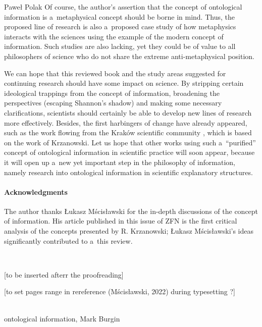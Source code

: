 \begin{newrevengenv}{Paweł Polak}
Of course, the author's assertion that the concept of ontological information is a~metaphysical concept should be borne in mind. Thus, the proposed line of research is also a~proposed case study of how metaphysics interacts with the sciences using the example of the modern concept of information. Such studies are also lacking, yet they could be of value to all philosophers of science who do not share the extreme anti-metaphysical position.

We can hope that this reviewed book and the study areas suggested for continuing research should have some impact on science. By stripping certain ideological trappings from the concept of information, broadening the perspectives (escaping Shannon's shadow) and making some necessary clarifications, scientists should certainly be able to develop new lines of research more effectively. Besides, the first harbingers of change have already appeared, such as the work flowing from the Kraków scientific community
\parencite[][]{bielecki_information_2022}, %
 which is based on the work of Krzanowski. Let us hope that other works using such a~``purified'' concept of ontological information in scientific practice will soon appear, because it will open up a~new yet important step in the philosophy of information, namely research into ontological information in scientific explanatory structures.

\paragraph{Acknowledgments}

The author thanks Łukasz Mścisławski for the in-depth discussions of the concept of information. His article
\parencite[][]{mscislawski_is_2022} %
 published in this issue of ZFN is the first critical analysis of the concepts presented by R. Krzanowski; Łukasz Mścisławski's ideas significantly contributed to a~this review.


\vspace{15mm}%
{}\\
{[to be inserted afterr the proofreading]

[to set pages range in rereference (Mścisławski, 2022) during typesetting ?]}\par%
\vspace{2mm}%
{}\\
{ontological information, Mark Burgin}%



\end{newrevengenv}